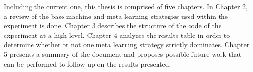 Including the current one, this thesis is comprised of five chapters. In
Chapter 2, a review of the base machine and meta learning strategies used
within the experiment is done. Chapter 3 describes the structure of the code of
the experiment at a high level. Chapter 4 analyzes the results table in
order to determine whether or not one meta learning strategy strictly dominates.
Chapter 5 presents a summary of the document and proposes possible future work
that can be performed to follow up on the results presented.

\pagebreak
